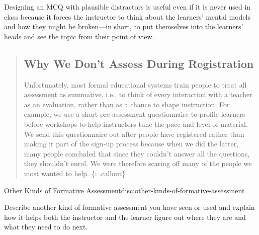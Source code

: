 Designing an MCQ with plausible distractors is useful even if it is
never used in class because it forces the instructor to think about the
learners' mental models and how they might be broken---in short, to put
themselves into the learners' heads and see the topic from their point
of view.

\begin{quote}
\subsection{Why We Don't Assess During
Registration}\label{why-we-dont-assess-during-registration}

Unfortunately, most formal educational systems train people to treat all
assessment as summative, i.e., to think of every interaction with a
teacher as an evaluation, rather than as a chance to shape instruction.
For example, we use a short pre-assessment questionnaire to profile
learners before workshops to help instructors tune the pace and level of
material. We send this questionnaire out after people have registered
rather than making it part of the sign-up process because when we did
the latter, many people concluded that since they couldn't answer all
the questions, they shouldn't enrol. We were therefore scaring off many
of the people we most wanted to help. \{: .callout\}
\end{quote}

\begin{discussion}{Other Kinds of Formative Assessment}{disc:other-kinds-of-formative-assessment}

Describe another kind of formative assessment you have seen or used and
explain how it helps both the instructor and the learner figure out
where they are and what they need to do next.
\end{discussion}

